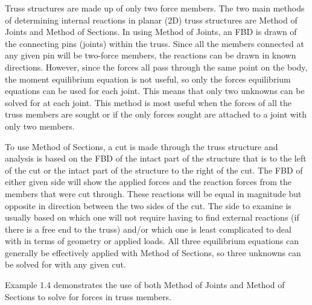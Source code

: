 \documentclass[
  letterpaper,
  DIV=11,
  numbers=noendperiod]{scrreprt}
\begin{document}
Truss structures are made up of only two force members. The two main
methods of determining internal reactions in planar (2D) truss
structures are Method of Joints and Method of Sections. In using Method
of Joints, an FBD is drawn of the connecting pins (joints) within the
truss. Since all the members connected at any given pin will be
two-force members, the reactions can be drawn in known directions.
However, since the forces all pass through the same point on the body,
the moment equilibrium equation is not useful, so only the forces
equilibrium equations can be used for each joint. This means that only
two unknowns can be solved for at each joint. This method is most useful
when the forces of all the truss members are sought or if the only
forces sought are attached to a joint with only two members.

To use Method of Sections, a cut is made through the truss structure and
analysis is based on the FBD of the intact part of the structure that is
to the left of the cut or the intact part of the structure to the right
of the cut. The FBD of either given side will show the applied forces
and the reaction forces from the members that were cut through. These
reactions will be equal in magnitude but opposite in direction between
the two sides of the cut. The side to examine is usually based on which
one will not require having to find external reactions (if there is a
free end to the truss) and/or which one is least complicated to deal
with in terms of geometry or applied loads. All three equilibrium
equations can generally be effectively applied with Method of Sections,
so three unknowns can be solved for with any given cut.

Example 1.4 demonstrates the use of both Method of Joints and Method of
Sections to solve for forces in truss members.
\end{document}
